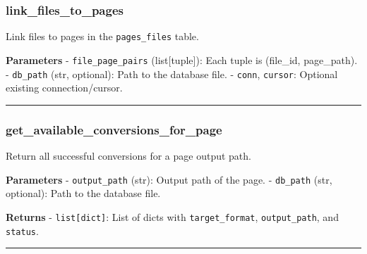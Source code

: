 \subsubsection{link\_files\_to\_pages}\label{link_files_to_pages}

\begin{Shaded}
\begin{Highlighting}[]
\OperatorTok{=}\OperatorTok{=}\OperatorTok{=}\NormalTok{)}
\end{Highlighting}
\end{Shaded}

Link files to pages in the \texttt{pages\_files} table.

\textbf{Parameters} - \texttt{file\_page\_pairs} (list{[}tuple{]}): Each
tuple is (file\_id, page\_path). - \texttt{db\_path} (str, optional):
Path to the database file. - \texttt{conn}, \texttt{cursor}: Optional
existing connection/cursor.

\begin{center}\rule{0.5\linewidth}{0.5pt}\end{center}

\subsubsection{get\_available\_conversions\_for\_page}\label{get_available_conversions_for_page}

\begin{Shaded}
\begin{Highlighting}[]
\OperatorTok{=}\NormalTok{)}
\end{Highlighting}
\end{Shaded}

Return all successful conversions for a page output path.

\textbf{Parameters} - \texttt{output\_path} (str): Output path of the
page. - \texttt{db\_path} (str, optional): Path to the database file.

\textbf{Returns} - \texttt{list{[}dict{]}}: List of dicts with
\texttt{target\_format}, \texttt{output\_path}, and \texttt{status}.

\begin{center}\rule{0.5\linewidth}{0.5pt}\end{center}

